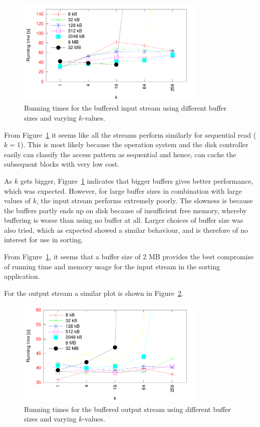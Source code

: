 \documentclass[a4paper,12pt]{article}
\begin{document}
\begin{figure}[h!]
  \centering
  \includegraphics[width=0.8\textwidth]{buffered_input}
  \caption{Running times for the buffered input stream using different
    buffer sizes and varying $k$-values.}
  \label{fig:buffered-input}
\end{figure}

From Figure~\ref{fig:buffered-input} it seems like all the streams
perform similarly for sequential read ($k = 1$). This is most likely because the operation system and the disk controller easily can classify the access pattern as sequential and hence, can cache the subsequent blocks with very low cost.

As $k$ gets bigger, Figure~\ref{fig:buffered-input} indicates that
bigger buffers gives better performance, which was expected. However,
for large buffer sizes in combination with large values of $k$, the
input stream performs extremely poorly. The slowness is because the
buffers partly ends up on disk because of insufficient free memory, whereby buffering is worse than
using no buffer at all. Larger choices of buffer size was also tried,
which as expected showed a similar behaviour, and is therefore of no
interest for use in sorting.

From Figure~\ref{fig:buffered-input}, it seems that a buffer size of 2
MB provides the best compromise of running time and memory usage for
the input stream in the sorting application.

For the output stream a similar plot is shown in
Figure~\ref{fig:buffered-output}.

\begin{figure}[h!]
  \centering
  \includegraphics[width=0.8\textwidth]{buffered_output}
  \caption{Running times for the buffered output stream using different
    buffer sizes and varying $k$-values.}
  \label{fig:buffered-output}
\end{figure}
\end{document}
